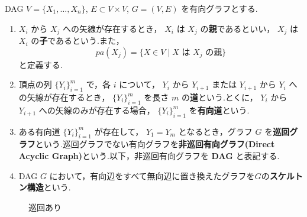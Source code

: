 \documentclass[uplatex, dvipdfmx]{jsarticle}
\begin{document}
\begin{defn}{DAG}
$V = \{X_1, \dots, X_n\}$, $E \subset V \times V$, $G = (V, E)$ を有向グラフとする.
  \begin{enumerate}
      \item $X_i$ から $X_j$ への矢線が存在するとき， $X_i$ は $X_j$ の\textbf{親}であるといい， $X_j$ は $X_i$ の\textbf{子}であるという.また，
      \begin{equation}
          pa(X_j) = \{ X \in V \mid X \text{ は } X_j \text{ の親} \}
      \end{equation}
      と定義する.
      \item 頂点の列 $\{Y_i\}_{i=1}^m$ で，各 $i$ について， $Y_i$ から $Y_{i+1}$ または $Y_{i+1}$ から $Y_i$ への矢線が存在するとき， $\{Y_i\}_{i=1}^m$ を長さ $m$ の\textbf{道}という.とくに， $Y_i$ から $Y_{i+1}$ への矢線のみが存在する場合， $\{Y_i\}_{i=1}^m$ を\textbf{有向道}という.
      \item ある有向道 $\{Y_i\}_{i=1}^m$ が存在して， $Y_1 = Y_m$ となるとき，グラフ $G$ を\textbf{巡回グラフ}という.巡回グラフでない有向グラフを\textbf{非巡回有向グラフ(Direct Acyclic Graph)}という.以下，非巡回有向グラフを \textbf{DAG} と表記する.
      \item DAG $G$ において，有向辺をすべて無向辺に置き換えたグラフを$G$の\textbf{スケルトン構造}という.
  \end{enumerate}
\end{defn}

\begin{figure}[H]
  \begin{minipage}{0.45\textwidth}
      \centering
      \caption{巡回なし}
  \end{minipage}
  \begin{minipage}{0.45\textwidth}
      \centering
      \caption{巡回あり}
  \end{minipage}
\end{figure}
\end{document}
